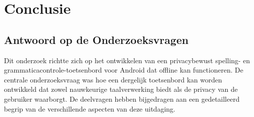 
\chapter{Conclusie}%
\label{ch:conclusie}

\section{Antwoord op de Onderzoeksvragen}

Dit onderzoek richtte zich op het ontwikkelen van een privacybewust spelling- en grammaticacontrole-toetsenbord voor Android dat offline kan functioneren. De centrale onderzoeksvraag was hoe een dergelijk toetsenbord kan worden ontwikkeld dat zowel nauwkeurige taalverwerking biedt als de privacy van de gebruiker waarborgt. De deelvragen hebben bijgedragen aan een gedetailleerd begrip van de verschillende aspecten van deze uitdaging.

